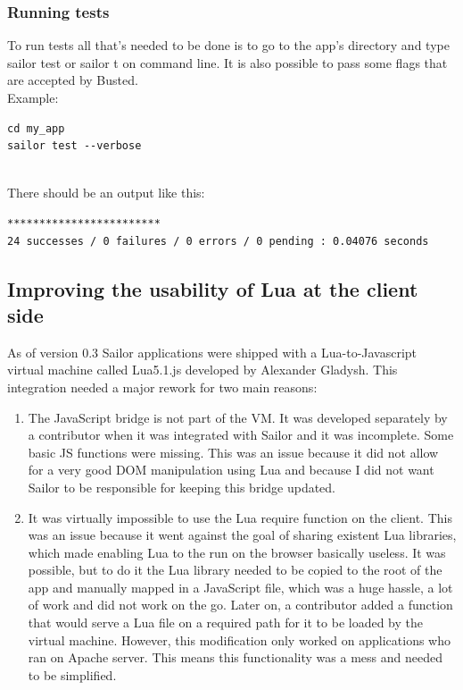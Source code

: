 \documentclass{article}
\begin{document}
\subsubsection{Running tests}

To run tests all that's needed to be done is to go to the app's directory and type sailor test or sailor t on command line. It is also possible to pass some flags that are accepted by Busted.\\

Example:
\begin{lstlisting}[frame=single]
cd my_app
sailor test --verbose
\end{lstlisting}\\

There should be an output like this:
\begin{lstlisting}[frame=single]
************************
24 successes / 0 failures / 0 errors / 0 pending : 0.04076 seconds
\end{lstlisting}



\subsection{Improving the usability of Lua at the client side}

As of version 0.3 Sailor applications were shipped with a Lua-to-Javascript virtual machine called Lua5.1.js\autocite{lua51js} developed by Alexander Gladysh. This integration needed a major rework for two main reasons:\\

\begin{enumerate}\item The JavaScript bridge is not part of the VM. It was developed separately by a contributor when it was integrated with Sailor and it was incomplete. Some basic JS functions were missing. This was an issue because it did not allow for a very good DOM manipulation using Lua and because I did not want Sailor to be responsible for keeping this bridge updated. 

\item It was virtually impossible to use the Lua require function on the client. This was an issue because it went against the goal of sharing existent Lua libraries, which made enabling Lua to the run on the browser basically useless. It was possible, but to do it the Lua library needed to be copied to the root of the app and manually mapped in a JavaScript file, which was a huge hassle, a lot of work and did not work on the go. Later on, a contributor added a function that would serve a Lua file on a required path for it to be loaded by the virtual machine. However, this modification only worked on applications who ran on Apache server. This means this functionality was a mess and needed to be simplified. 
\end{enumerate}\\
\end{document}
